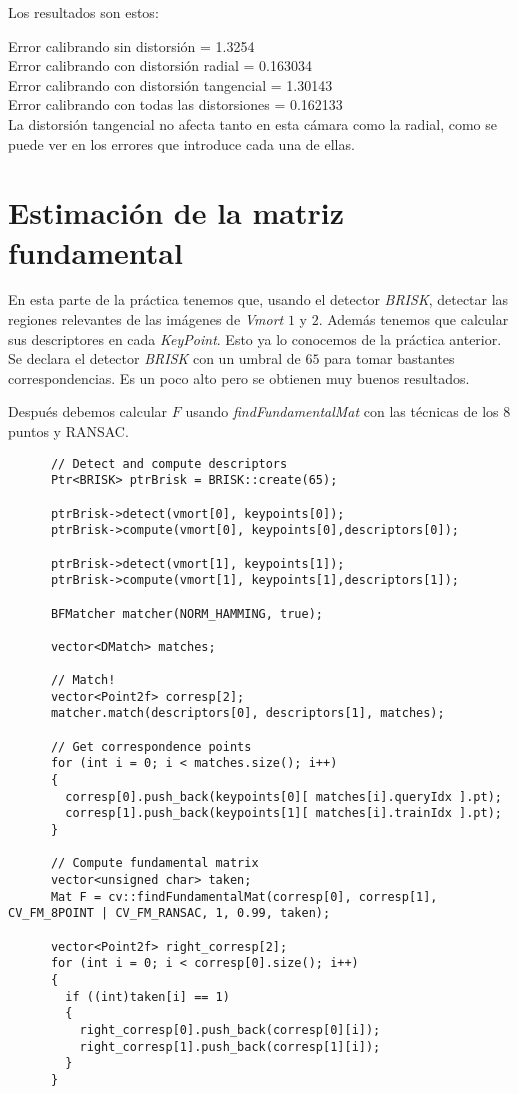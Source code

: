 \documentclass[a4paper, 11pt]{article}
\theoremstyle{definition}
\begin{document}
      Los resultados son estos:

      Error calibrando sin distorsión = 1.3254 \\
      Error calibrando con distorsión radial = 0.163034 \\
      Error calibrando con distorsión tangencial = 1.30143 \\
      Error calibrando con todas las distorsiones = 0.162133 \\

      La distorsión tangencial no afecta tanto en esta cámara como la radial, como se puede
      ver en los errores que introduce cada una de ellas.

  \section{Estimación de la matriz fundamental}

    En esta parte de la práctica tenemos que, usando el detector \emph{BRISK},
    detectar las regiones relevantes de las imágenes de \emph{Vmort} $1$ y $2$.
    Además tenemos que calcular sus descriptores en cada \emph{KeyPoint}.
    Esto ya lo conocemos de la práctica anterior. Se declara el detector \emph{BRISK}
    con un umbral de $65$ para tomar bastantes correspondencias. Es un poco alto
    pero se obtienen muy buenos resultados.

    Después debemos calcular $F$ usando \emph{findFundamentalMat} con las técnicas
    de los 8 puntos y RANSAC.

    \begin{lstlisting}
      // Detect and compute descriptors
      Ptr<BRISK> ptrBrisk = BRISK::create(65);

      ptrBrisk->detect(vmort[0], keypoints[0]);
      ptrBrisk->compute(vmort[0], keypoints[0],descriptors[0]);

      ptrBrisk->detect(vmort[1], keypoints[1]);
      ptrBrisk->compute(vmort[1], keypoints[1],descriptors[1]);

      BFMatcher matcher(NORM_HAMMING, true);

      vector<DMatch> matches;

      // Match!
      vector<Point2f> corresp[2];
      matcher.match(descriptors[0], descriptors[1], matches);

      // Get correspondence points
      for (int i = 0; i < matches.size(); i++)
      {
        corresp[0].push_back(keypoints[0][ matches[i].queryIdx ].pt);
        corresp[1].push_back(keypoints[1][ matches[i].trainIdx ].pt);
      }

      // Compute fundamental matrix
      vector<unsigned char> taken;
      Mat F = cv::findFundamentalMat(corresp[0], corresp[1], CV_FM_8POINT | CV_FM_RANSAC, 1, 0.99, taken);

      vector<Point2f> right_corresp[2];
      for (int i = 0; i < corresp[0].size(); i++)
      {
        if ((int)taken[i] == 1)
        {
          right_corresp[0].push_back(corresp[0][i]);
          right_corresp[1].push_back(corresp[1][i]);
        }
      }
    \end{lstlisting}
\end{document}
